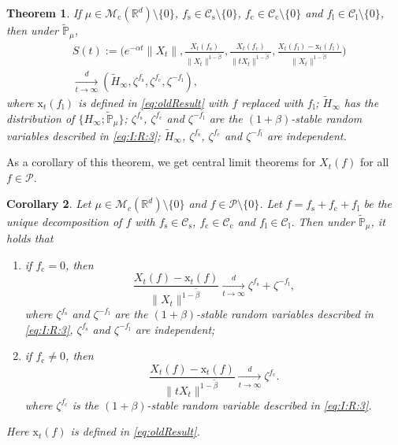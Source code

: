 \documentclass[12pt,a4paper]{amsart}
\theoremstyle{plain}
\newtheorem{thm}{Theorem}[section]
\newtheorem{cor}[thm]{Corollary}
\theoremstyle{definition}
\numberwithin{equation}{section}
\begin{document}
\begin{thm}
	\label{thm:M}
	If $\mu\in \mathcal M_\mathrm c(\mathbb R^d)\setminus \{0\}$, $f_\mathrm s\in \mathcal C_\mathrm s\setminus\{0\}$, $f_\mathrm c \in \mathcal C_\mathrm c\setminus\{0\}$ and $f_\mathrm l \in \mathcal C_\mathrm l\setminus\{0\}$, then under $\mathbb {\widetilde P}_\mu$,
	\begin{align} \label{eq:M.1}
	&S(t):=
	\Bigg(e^{-\alpha t}\|X_t\|, \frac{X_t(f_\mathrm s)}{\|X_t\|^{1-\tilde \beta}},\frac{X_t(f_\mathrm c)}{\|tX_t\|^{1-\tilde \beta}},
	\frac{ X_t(f_\mathrm l) - \mathrm x_t(f_\mathrm l)}{\|X_t\|^{1-\tilde \beta}}
	\Bigg)
	\\&\xrightarrow[t\rightarrow \infty]{d}(\widetilde H_\infty,\zeta^{f_\mathrm s},\zeta^{f_\mathrm c},\zeta^{-f_\mathrm l}),
	\end{align}
	where 
$\mathrm x_t(f_\mathrm l)$ is defined in \eqref{eq:oldResult} with $f$ replaced with $f_\mathrm l$;
$\widetilde H_\infty$ has the distribution of $\{H_{\infty}; \widetilde {\mathbb P}_\mu\}$; $\zeta^{f_\mathrm s}$, $\zeta^{f_\mathrm c}$ and $\zeta^{-f_\mathrm l}$ are the $(1+\beta)$-stable random variables described in \eqref{eq:I:R:3}; $\widetilde H_\infty$,  $\zeta^{f_\mathrm s}$, $\zeta^{f_\mathrm c}$ and $\zeta^{-f_\mathrm l}$ are independent.
\end{thm}

As a corollary of this theorem, we get  central limit theorems for $X_t(f)$ for all $f\in \mathcal P$.

\begin{cor} Let $\mu\in \mathcal M_c(\mathbb R^d)\setminus \{0\}$ and $f\in \mathcal P\setminus\{0\}$. Let  $f=f_\mathrm s + f_\mathrm c + f_\mathrm l$ be the unique decomposition of $f$ with $f_\mathrm s \in \mathcal C_\mathrm s$, $f_\mathrm c \in \mathcal C_\mathrm c$ and $f_\mathrm l \in \mathcal C_\mathrm l$.
Then under $\widetilde {\mathbb{P}}_{\mu}$, it holds that
\begin{enumerate}
\item  if $f_\mathrm c=0$, then
\[
    \frac{ X_t(f) - \mathrm x_t(f)}{\|X_t\|^{1-\tilde \beta}}
    \xrightarrow[t\to \infty]{d}
       \zeta^{f_\mathrm s}+\zeta^{-f_\mathrm l},
\]
	where $\zeta^{f_\mathrm s}$ and $\zeta^{-f_\mathrm l}$  are the $(1+\beta)$-stable random variables described in \eqref{eq:I:R:3}, $\zeta^{f_\mathrm s}$ and $\zeta^{-f_\mathrm l}$ are independent;
\item if $f_\mathrm c\neq0$, then
\[
    \frac{ X_t(f) - \mathrm x_t(f)}{\|tX_t\|^{1-\tilde \beta}}
    \xrightarrow[t\to \infty]{d}\zeta^{f_\mathrm c}.
\]
	where $\zeta^{f_\mathrm c}$ is the $(1+\beta)$-stable random variable described in \eqref{eq:I:R:3}.
\end{enumerate}
Here $\mathrm x_t(f)$ is defined in \eqref{eq:oldResult}.
\end{cor}
\end{document}

